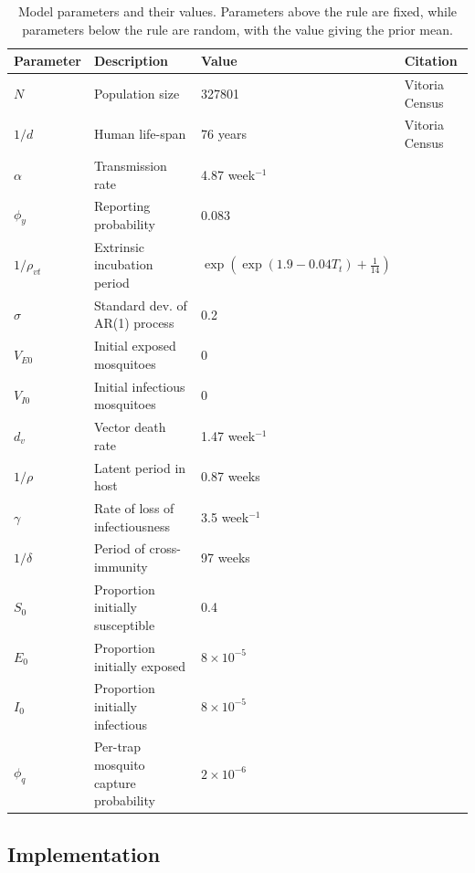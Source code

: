 \documentclass[10pt,letterpaper]{article}
\begin{document}
\begin{table}[!ht]
\label{fixedparms}
\begin{adjustwidth}{-2.25in}{0in} 
\begin{center}
\caption{Model parameters and their values.  Parameters above the rule are fixed, while parameters below the rule are random, with the value giving the prior mean.}
\begin{tabular}{llll}
Parameter & Description & Value & Citation\\
\hline
$N$ & Population size & 327801 & Vitoria Census\\
$1/d$ & Human life-span & 76 years & Vitoria Census\\
$\alpha$ & Transmission rate & 4.87 week$^{-1}$ & \cite{Scott2000}\\
$\phi_y$ & Reporting probability & 0.083 & \cite{Silva2016}\\
$1/\rho_{vt}$ & Extrinsic incubation period & $\exp \left(\exp(1.9 - 0.04 T_t) + \frac{1}{14}\right)$ & \cite{Chan2012}\\
$\sigma$  & Standard dev. of AR(1) process & 0.2 & \\
$V_{E0}$ & Initial exposed mosquitoes &  0 & \\
$V_{I0}$ & Initial infectious mosquitoes & 0 & \\
\hline
$d_v$ & Vector death rate & 1.47 week$^{-1}$ & \cite{Brady2013} \\
$1/\rho$ & Latent period in host & 0.87 weeks  & \cite{Chan2012}\\
$\gamma$ & Rate of loss of infectiousness & 3.5 week$^{-1}$ & \cite{Nguyet2013}\\
$1/\delta$ & Period of cross-immunity & 97 weeks &  \cite{Reich2013}\\
$S_0$ & Proportion initially susceptible & 0.4 & \cite{Cardoso2011a} \\
$E_0$ & Proportion initially exposed & $8\times 10 ^ {-5}$ & \\
$I_0$ & Proportion initially infectious & $8\times 10 ^ {-5}$ & \\
$\phi_q$ & Per-trap mosquito capture probability & $2 \times 10^{-6}$ & 
\end{tabular}
\end{center}
\end{adjustwidth}
\end{table}


\subsection*{Implementation}
 
\end{document}
